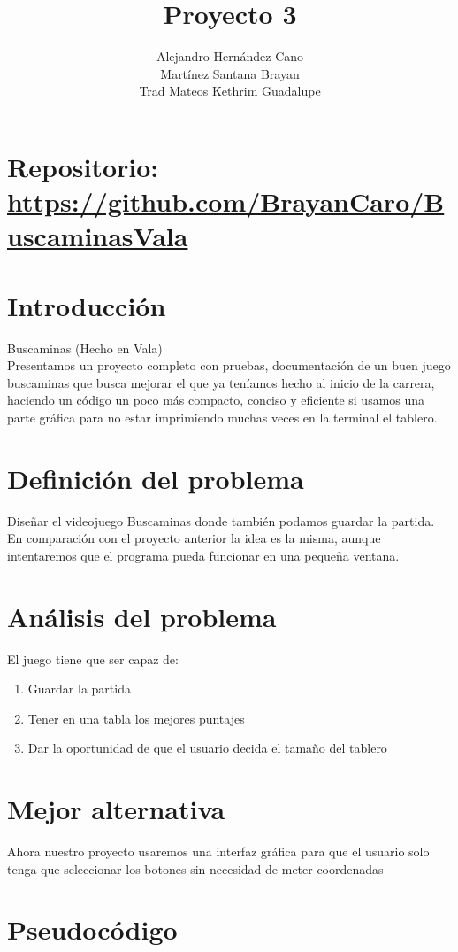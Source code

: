 \documentclass{article}
\title{Proyecto 3}
\author{Alejandro Hernández Cano\\
    Martínez Santana Brayan\\
    Trad Mateos Kethrim Guadalupe}
\begin{document}
    \maketitle
    \section*{Repositorio: \url{https://github.com/BrayanCaro/BuscaminasVala}}
    
    \section{Introducción}
    Buscaminas (Hecho en Vala)\\
    Presentamos un proyecto completo con pruebas, documentación de un buen juego buscaminas que busca mejorar el que ya teníamos hecho al inicio de la carrera, haciendo un código un poco más compacto, conciso y eficiente si usamos una parte gráfica para no estar imprimiendo muchas veces en la terminal el tablero.
    \section{Definición del problema}
    Diseñar el videojuego Buscaminas donde también podamos guardar la partida.\\
    En comparación con el proyecto anterior la idea es la misma, aunque intentaremos que el programa pueda funcionar en una pequeña ventana.
    \section{Análisis del problema}
    El juego tiene que ser capaz de:
    \begin{enumerate}
        \item Guardar la partida
        \item Tener en una tabla los mejores puntajes
        \item Dar la oportunidad de que el usuario decida el tamaño del tablero
    \end{enumerate}
    \section{Mejor alternativa}
    Ahora nuestro proyecto usaremos una interfaz gráfica para que el usuario solo tenga que seleccionar los botones sin necesidad de meter coordenadas
    \section{Pseudocódigo}
    
\end{document}
